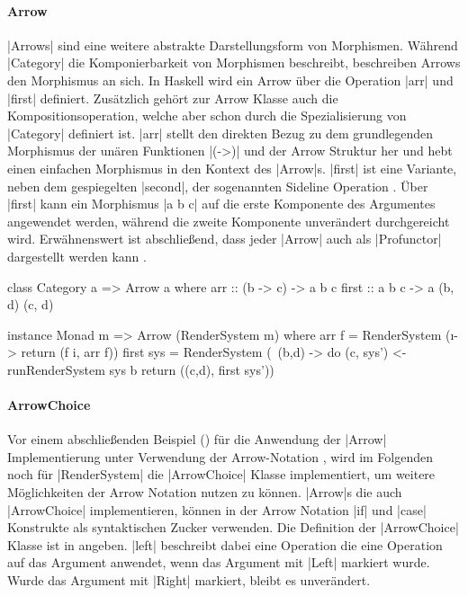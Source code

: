 
\paragraph{Arrow}

|Arrows| sind eine weitere abstrakte Darstellungsform von Morphismen. Während |Category| die Komponierbarkeit von Morphismen beschreibt, beschreiben Arrows den Morphismus an sich. In Haskell wird ein Arrow über die Operation |arr| und |first| definiert. Zusätzlich gehört zur Arrow Klasse auch die Kompositionsoperation, welche aber schon durch die Spezialisierung von |Category| definiert ist. |arr| stellt den direkten Bezug zu dem grundlegenden Morphismus der unären Funktionen |(->)| und der Arrow Struktur her und hebt einen einfachen Morphismus in den Kontext des |Arrow|s. |first| ist eine Variante, neben dem gespiegelten |second|, der sogenannten Sideline Operation \parencite[Kapitel 1]{Asada2010}. Über |first| kann ein Morphismus |a b c| auf die erste Komponente des Argumentes angewendet werden, während die zweite Komponente unverändert durchgereicht wird. Erwähnenswert ist abschließend, dass jeder |Arrow| auch als |Profunctor| dargestellt werden kann \parencite[Kapitel 3]{Asada2010}.

\begin{haskell}[label={lst:class-arrow},caption={Arrow Klasse\protect\footnotemark},nolol]
class Category a => Arrow a where
  arr :: (b -> c) -> a b c
  first :: a b c -> a (b, d) (c, d)
\end{haskell}


\begin{haskell}[label={lst:rendersystem-arrow},caption={Arrow Instanz für RenderSystem}]
instance Monad m => Arrow (RenderSystem m) where
  arr f = RenderSystem (\i -> return (f i, arr f))
  first sys = RenderSystem (\ (b,d) -> do
    (c, sys') <- runRenderSystem sys b
    return ((c,d), first sys'))
\end{haskell}


\paragraph{ArrowChoice}

Vor einem abschließenden Beispiel () für die Anwendung der |Arrow| Implementierung unter Verwendung der Arrow-Notation \footnotemark, wird im Folgenden noch für |RenderSystem| die |ArrowChoice| Klasse implementiert, um weitere Möglichkeiten der Arrow Notation nutzen zu können. |Arrow|s die auch |ArrowChoice| implementieren, können in der Arrow Notation |if| und |case| Konstrukte als syntaktischen Zucker verwenden. Die Definition der |ArrowChoice| Klasse ist in  angeben. |left| beschreibt dabei eine Operation die eine Operation auf das Argument anwendet, wenn das Argument mit |Left| markiert wurde. Wurde das Argument mit |Right| markiert, bleibt es unverändert.

